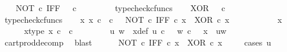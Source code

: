 \begin{isabellebody}
\ \ \isamarkupfalse%
\ {\isachardoublequoteopen}NOT\ {\isasymcirc}\isactrlsub c\ IFF\ {\isacharcolon}{\kern0pt}\ {\isasymOmega}\ {\isasymtimes}\isactrlsub c\ {\isasymOmega}\ {\isasymrightarrow}\ {\isasymOmega}{\isachardoublequoteclose}\isanewline
\ \ \ \ \isamarkupfalse%
\ typecheck{\isacharunderscore}{\kern0pt}cfuncs\isanewline
\ \ \isamarkupfalse%
\ {\isachardoublequoteopen}XOR\ {\isacharcolon}{\kern0pt}\ {\isasymOmega}\ {\isasymtimes}\isactrlsub c\ {\isasymOmega}\ {\isasymrightarrow}\ {\isasymOmega}{\isachardoublequoteclose}\isanewline
\ \ \ \ \isamarkupfalse%
\ typecheck{\isacharunderscore}{\kern0pt}cfuncs\isanewline
\ \ \isamarkupfalse%
\ {\isachardoublequoteopen}{\isasymAnd}x{\isachardot}{\kern0pt}\ x\ {\isasymin}\isactrlsub c\ {\isasymOmega}\ {\isasymtimes}\isactrlsub c\ {\isasymOmega}\ {\isasymLongrightarrow}\ {\isacharparenleft}{\kern0pt}NOT\ {\isasymcirc}\isactrlsub c\ IFF{\isacharparenright}{\kern0pt}\ {\isasymcirc}\isactrlsub c\ x\ {\isacharequal}{\kern0pt}\ XOR\ {\isasymcirc}\isactrlsub c\ x{\isachardoublequoteclose}\isanewline
\ \ \isamarkupfalse%
\ {\isacharminus}{\kern0pt}\ \isanewline
\ \ \ \ \isamarkupfalse%
\ x\ \ \ \isanewline
\ \ \ \ \isamarkupfalse%
\ x{\isacharunderscore}{\kern0pt}type{\isacharcolon}{\kern0pt}\ {\isachardoublequoteopen}x\ {\isasymin}\isactrlsub c\ {\isasymOmega}\ {\isasymtimes}\isactrlsub c\ {\isasymOmega}{\isachardoublequoteclose}\isanewline
\ \ \ \ \isamarkupfalse%
\ \isamarkupfalse%
\ u\ w\ \ x{\isacharunderscore}{\kern0pt}def{\isacharcolon}{\kern0pt}\ {\isachardoublequoteopen}u\ {\isasymin}\isactrlsub c\ {\isasymOmega}\ {\isasymand}\ w\ {\isasymin}\isactrlsub c\ {\isasymOmega}\ {\isasymand}\ x\ {\isacharequal}{\kern0pt}\ {\isasymlangle}u{\isacharcomma}{\kern0pt}w{\isasymrangle}{\isachardoublequoteclose}\isanewline
\ \ \ \ \ \ \isamarkupfalse%
\ cart{\isacharunderscore}{\kern0pt}prod{\isacharunderscore}{\kern0pt}decomp\ \isamarkupfalse%
\ blast\isanewline
\ \ \ \ \isamarkupfalse%
\ {\isachardoublequoteopen}{\isacharparenleft}{\kern0pt}NOT\ {\isasymcirc}\isactrlsub c\ IFF{\isacharparenright}{\kern0pt}\ {\isasymcirc}\isactrlsub c\ x\ {\isacharequal}{\kern0pt}\ XOR\ {\isasymcirc}\isactrlsub c\ x{\isachardoublequoteclose}\isanewline
\ \ \ \ \isamarkupfalse%
{\isacharparenleft}{\kern0pt}cases\ {\isachardoublequoteopen}u\ {\isacharequal}{\kern0pt}\ {\isasymt}{\isachardoublequoteclose}{\isacharparenright}{\kern0pt}\isanewline

\end{isabellebody}
